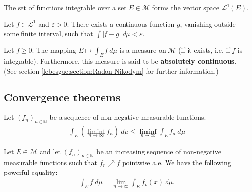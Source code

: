     \begin{definition}
        The set of functions integrable over a set $E\in\mathcal{M}$ forms the vector space $\mathcal{L}^1(E)$.
    \end{definition}

    \begin{property}
        Let $f\in\mathcal{L}^1$ and $\varepsilon>0$. There exists a continuous function $g$, vanishing outside some finite interval, such that $\int|f-g|\ d\mu<\varepsilon$.
    \end{property}

    \begin{property}\label{lebesgue:theorem:measure_by_integral}
        Let $f\geq0$. The mapping $E\mapsto\int_Ef\ d\mu$ is a measure on $\mathcal{M}$ (if it exists, i.e. if $f$ is integrable). Furthermore, this measure is said to be \textbf{absolutely continuous}. (See section \ref{lebesgue:section:Radon-Nikodym} for further information.)
    \end{property}


\subsection{Convergence theorems}

    \begin{theorem}\label{lebesgue:theorem:fatous_lemma}
        Let $(f_n)_{n\in\mathbb{N}}$ be a sequence of non-negative measurable functions.
        \begin{gather}
            \int_E\left(\liminf_{n\rightarrow\infty}f_n\right)\ d\mu \leq \liminf_{n\rightarrow\infty}\int_Ef_n\ d\mu
        \end{gather}
    \end{theorem}
    \begin{theorem}\label{lebesgue:theorem:monotone_convergence_theorem}
        Let $E\in\mathcal{M}$ and let $(f_n)_{n\in\mathbb{N}}$ be an increasing sequence of non-negative measurable functions such that $f_n\nearrow f$ pointwise a.e. We have the following powerful equality:
        \begin{gather}
            \int_E f\ d\mu = \lim_{n\rightarrow\infty}\int_E f_n(x)\ d\mu.
        \end{gather}
    \end{theorem}

